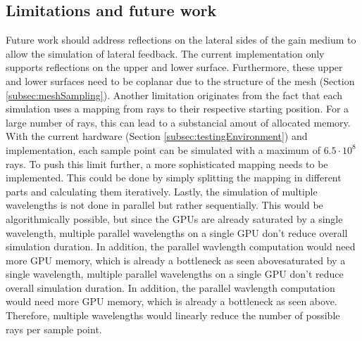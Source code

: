 \subsection{Limitations and future work}
\label{subsec:limitations}
Future work should address reflections on the lateral sides of the gain medium
to allow the simulation of lateral feedback. The current implementation only
supports reflections on the upper and lower surface. Furthermore, these upper
and lower surfaces need to be coplanar due to the structure of the mesh
(Section \ref{subsec:meshSampling}).
Another limitation originates from the fact that each simulation uses a mapping
from rays to their respective starting position. For a large number of rays,
this can lead to a substancial amout of allocated memory. With the current
hardware (Section \ref{subsec:testingEnvironment}) and implementation, each sample
point can be simulated with a maximum of $6.5\cdot10^8$ rays. To push this limit
further, a more sophisticated mapping needs to be implemented. This could
be done by simply splitting the mapping in different parts and calculating them
iteratively.
Lastly, the simulation of multiple wavelengths is not done in parallel but
rather sequentially. This would be algorithmically possible, but since the GPUs
are already saturated by a single wavelength, multiple parallel wavelengths on a
single GPU don't reduce overall simulation duration. In addition, the parallel
wavlength computation would need more GPU memory, which is already a bottleneck
as seen abovesaturated by a single wavelength, multiple parallel wavelengths on
a single GPU don't reduce overall simulation duration. In addition, the parallel
wavlength computation would need more GPU memory, which is already a bottleneck
as seen above. Therefore, multiple wavelengths would linearly reduce the number
of possible rays per sample point.
